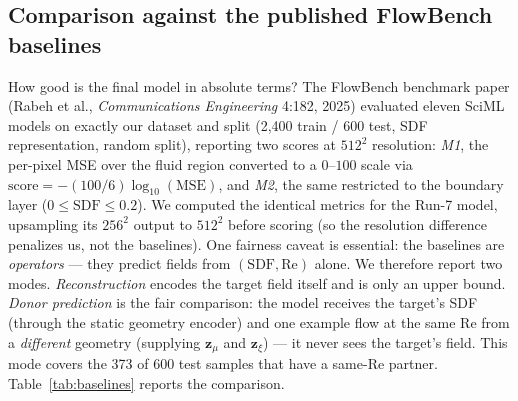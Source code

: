 \documentclass[11pt]{article}
\begin{document}
\subsection{Comparison against the published FlowBench baselines}

How good is the final model in absolute terms? The FlowBench benchmark
paper (Rabeh et al., \emph{Communications Engineering} 4:182, 2025)
evaluated eleven SciML models on exactly our dataset and split (2{,}400
train / 600 test, SDF representation, random split), reporting two
scores at $512^2$ resolution: \emph{M1}, the per-pixel MSE over the
fluid region converted to a $0$--$100$ scale via
$\mathrm{score} = -(100/6)\log_{10}(\mathrm{MSE})$, and \emph{M2}, the
same restricted to the boundary layer ($0 \le \mathrm{SDF} \le 0.2$).
We computed the identical metrics for the Run-7 model, upsampling its
$256^2$ output to $512^2$ before scoring (so the resolution difference
penalizes us, not the baselines). One fairness caveat is essential: the
baselines are \emph{operators} --- they predict fields from
$(\mathrm{SDF}, \mathrm{Re})$ alone. We therefore report two modes.
\emph{Reconstruction} encodes the target field itself and is only an
upper bound. \emph{Donor prediction} is the fair comparison: the model
receives the target's SDF (through the static geometry encoder) and one
example flow at the same Re from a \emph{different} geometry (supplying
$\boldsymbol{z}_{\mu}$ and $\boldsymbol{z}_{\xi}$) --- it never sees the
target's field. This mode covers the 373 of 600 test samples that have a
same-Re partner. Table~\ref{tab:baselines} reports the comparison.
\end{document}
